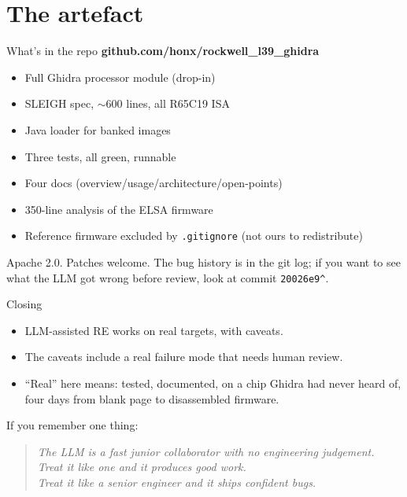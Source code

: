 \documentclass[aspectratio=169,11pt]{beamer}
\begin{document}
\section{The artefact}

\begin{frame}{What's in the repo}
\centering
\textbf{\large github.com/honx/rockwell\_l39\_ghidra}\\[0.6em]
\begin{itemize}\itemsep0.3em
  \item Full Ghidra processor module (drop-in)
  \item SLEIGH spec, $\sim$600 lines, all R65C19 ISA
  \item Java loader for banked images
  \item Three tests, all green, runnable
  \item Four docs (overview/usage/architecture/open-points)
  \item 350-line analysis of the ELSA firmware
  \item Reference firmware excluded by \texttt{.gitignore} (not ours
        to redistribute)
\end{itemize}
\vspace{0.8em}
Apache 2.0. Patches welcome. The bug history is in the git log; if
you want to see what the LLM got wrong before review, look at commit
\texttt{20026e9\^{}}.
\end{frame}

\begin{frame}{Closing}
\begin{itemize}
  \item LLM-assisted RE works on real targets, with caveats.
  \item The caveats include a real failure mode that needs human
        review.
  \item ``Real'' here means: tested, documented, on a chip Ghidra had
        never heard of, four days from blank page to disassembled
        firmware.
\end{itemize}
\vspace{0.8em}
If you remember one thing:
\begin{quote}
\itshape
The LLM is a fast junior collaborator with no engineering judgement.\\
Treat it like one and it produces good work.\\
Treat it like a senior engineer and it ships confident bugs.
\end{quote}
\end{frame}
\end{document}

